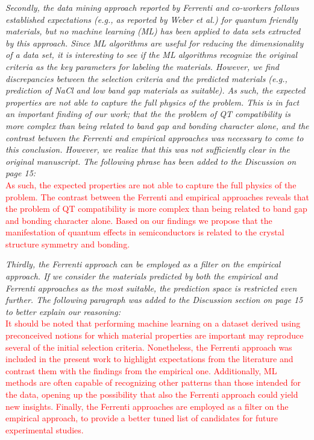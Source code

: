 \documentclass[11pt, a4paper]{letter} %
\newcommand{\mrk}[1]{\textcolor{red}{#1}}
\begin{document}
\textit{Secondly, the data mining approach reported by Ferrenti and co-workers follows established expectations (e.g., as reported by Weber et al.) for quantum friendly materials, but no machine learning (ML) has been applied to data sets extracted by this approach. Since ML algorithms are useful for reducing the dimensionality of a data set, it is interesting to see if the ML algorithms recognize the original criteria as the key parameters for labeling the materials. However, we find discrepancies between the selection criteria and the predicted materials (e.g., prediction of NaCl and low band gap materials as suitable).
As such, the expected properties are not able to capture the full physics of the problem. This is in fact an important finding of our work; that the the problem of QT compatibility is more complex than being related to band gap and bonding character alone, and the contrast between the Ferrenti and empirical approaches was necessary to come to this conclusion. However, we realize that this was not sufficiently clear in the original manuscript. 
The following phrase has been added to the Discussion on page 15:} \\
\mrk{As such, the expected properties are not able to capture the full physics of the problem. The contrast between the Ferrenti and empirical approaches reveals that the problem of QT compatibility is more complex than being related to band gap and bonding character alone. Based on our findings we propose that the manifestation of quantum effects in semiconductors is related to the crystal structure symmetry and bonding. }

\textit{Thirdly, the Ferrenti approach can be employed as a filter on the empirical approach. If we consider the materials predicted by both the empirical and Ferrenti approaches as the most suitable, the prediction space is restricted even further. The following paragraph was added to the Discussion section on page 15 to better explain our reasoning:} \\ 
\mrk{It should be noted that performing machine learning on a dataset derived using preconceived notions for which material properties are important may reproduce several of the initial selection criteria. Nonetheless, the Ferrenti approach was included in the present work to highlight expectations from the literature and contrast them with the findings from the empirical one. Additionally, ML methods are often capable of recognizing other patterns than those intended for the data, opening up the possibility that also the Ferrenti approach could yield new insights. Finally, the Ferrenti approaches are employed as a filter on the empirical approach, to provide a better tuned list of candidates for future experimental studies.}
\end{document}
